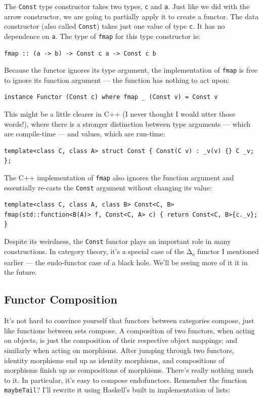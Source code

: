The \texttt{Const} type constructor takes two types, \texttt{c} and
\texttt{a}. Just like we did with the arrow constructor, we are going to
partially apply it to create a functor. The data constructor (also
called \texttt{Const}) takes just one value of type \texttt{c}. It has
no dependence on \texttt{a}. The type of \texttt{fmap} for this type
constructor is:

\begin{verbatim}
fmap :: (a -> b) -> Const c a -> Const c b
\end{verbatim}

Because the functor ignores its type argument, the implementation of
\texttt{fmap} is free to ignore its function argument --- the function
has nothing to act upon:

\begin{verbatim}
instance Functor (Const c) where fmap _ (Const v) = Const v
\end{verbatim}

This might be a little clearer in C++ (I never thought I would utter
those words!), where there is a stronger distinction between type
arguments --- which are compile-time --- and values, which are run-time:

\begin{verbatim}
template<class C, class A> struct Const { Const(C v) : _v(v) {} C _v; };
\end{verbatim}

The C++ implementation of \texttt{fmap} also ignores the function
argument and essentially re-casts the \texttt{Const} argument without
changing its value:

\begin{verbatim}
template<class C, class A, class B> Const<C, B> fmap(std::function<B(A)> f, Const<C, A> c) { return Const<C, B>{c._v}; }
\end{verbatim}

Despite its weirdness, the \texttt{Const} functor plays an important
role in many constructions. In category theory, it's a special case of
the Δ\textsubscript{c} functor I mentioned earlier --- the endo-functor
case of a black hole. We'll be seeing more of it it in the future.

\subsection{Functor Composition}\label{functor-composition}

It's not hard to convince yourself that functors between categories
compose, just like functions between sets compose. A composition of two
functors, when acting on objects, is just the composition of their
respective object mappings; and similarly when acting on morphisms.
After jumping through two functors, identity morphisms end up as
identity morphisms, and compositions of morphisms finish up as
compositions of morphisms. There's really nothing much to it. In
particular, it's easy to compose endofunctors. Remember the function
\texttt{maybeTail}? I'll rewrite it using Haskell's built in
implementation of lists:

